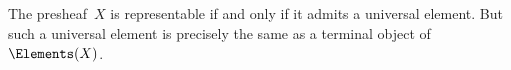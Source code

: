 \subsection{}

The presheaf~$X$ is representable if and only if it admits a universal element.
But such a universal element is precisely the same as a terminal object of~$\Elements(X)$.
